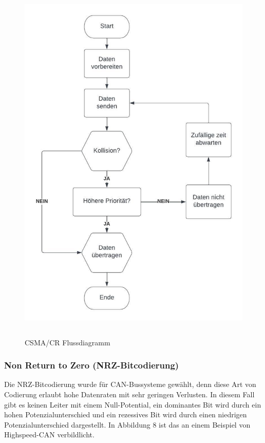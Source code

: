 \begin{figure}[h]
    \begin{center}
        \includegraphics[width=12.24cm, height= 17.78cm]{images/Abbildung 7.jpeg}
        \caption{CSMA/CR Flussdiagramm}
        \label{CSMA/CR}
        \end{center}
\end{figure}

\clearpage

\subsubsection{Non Return to Zero (NRZ-Bitcodierung)}
Die NRZ-Bitcodierung wurde für CAN-Bussysteme gewählt, denn diese Art von Codierung erlaubt hohe Datenraten mit sehr geringen Verlusten. In diesem Fall gibt es keinen Leiter mit einem Null-Potential, ein dominantes Bit wird durch ein hohen Potenzialunterschied und ein rezessives Bit wird durch einen niedrigen Potenzialunterschied dargestellt. In Abbildung 8 ist das an einem Beispiel von Highspeed-CAN verbildlicht. \\

